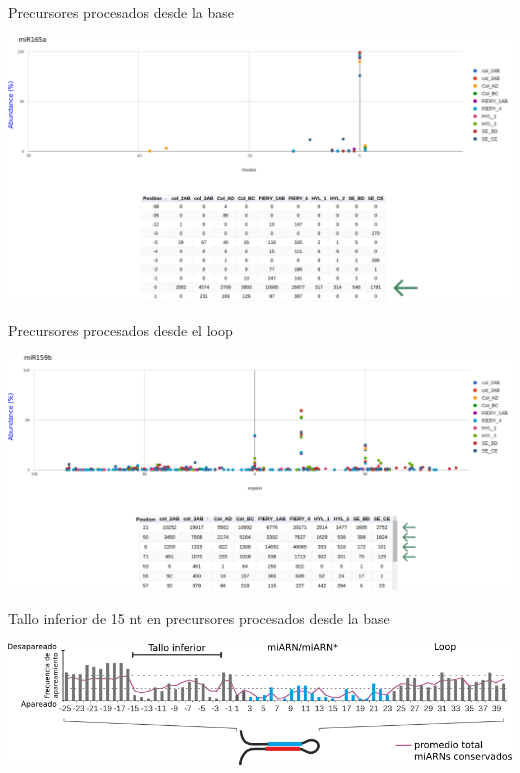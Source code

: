 \documentclass{beamer}
\begin{document}
\begin{frame}{Precursores procesados desde la base}
	\begin{center}
		\includegraphics[width=1\textwidth]{img/miR165a_SPARE.png}
	\end{center}
\end{frame}

\begin{frame}{Precursores procesados desde el loop}
	\begin{center}
		\includegraphics[width=1\textwidth]{img/miR159b_SPARE.png}
	\end{center}
\end{frame}

\begin{frame}{Tallo inferior de 15 nt en precursores procesados desde la base}
	\begin{center}
		\includegraphics[width=1\textwidth]{img/GR_fig2C.png}
	\end{center}
\end{frame}
\end{document}
